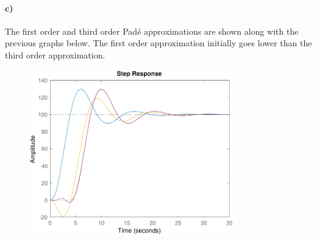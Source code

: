 \documentclass[12pt]{article}
\begin{document}
\paragraph{c)}

The first order and third order Pad\'e approximations are shown along with the previous graphs
below. The first order approximation initially goes lower than the third order approximation.
\begin{figure}[H]
    \begin{center}
        \includegraphics[width=3.5in]{problem10c.pdf}
    \end{center}
\end{figure}
\end{document}
